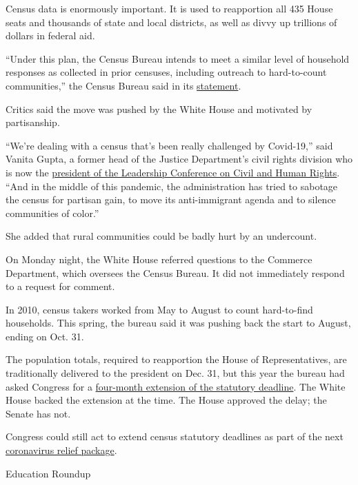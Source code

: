 Census data is enormously important. It is used to reapportion all 435
House seats and thousands of state and local districts, as well as divvy
up trillions of dollars in federal aid.

``Under this plan, the Census Bureau intends to meet a similar level of
household responses as collected in prior censuses, including outreach
to hard-to-count communities,'' the Census Bureau said in its
\href{https://www.census.gov/newsroom/press-releases/2020/delivering-complete-accurate-count.html}{statement}.

Critics said the move was pushed by the White House and motivated by
partisanship.

``We're dealing with a census that's been really challenged by
Covid-19,'' said Vanita Gupta, a former head of the Justice Department's
civil rights division who is now the
\href{https://civilrights.org/about/our-staff/vanita-gupta/}{president
of the Leadership Conference on Civil and Human Rights}. ``And in the
middle of this pandemic, the administration has tried to sabotage the
census for partisan gain, to move its anti-immigrant agenda and to
silence communities of color.''

She added that rural communities could be badly hurt by an undercount.

On Monday night, the White House referred questions to the Commerce
Department, which oversees the Census Bureau. It did not immediately
respond to a request for comment.

In 2010, census takers worked from May to August to count hard-to-find
households. This spring, the bureau said it was pushing back the start
to August, ending on Oct. 31.

The population totals, required to reapportion the House of
Representatives, are traditionally delivered to the president on Dec.
31, but this year the bureau had asked Congress for a
\href{https://www.nytimes.com/2020/04/13/us/census-coronavirus-delay.html?searchResultPosition=9}{four-month
extension of the statutory deadline}. The White House backed the
extension at the time. The House approved the delay; the Senate has not.

Congress could still act to extend census statutory deadlines as part of
the next
\href{https://www.nytimes.com/2020/08/02/us/politics/coronavirus-jobless-aid.html}{coronavirus
relief package}.

Education Roundup

\hypertarget{-3}{%
\subsection{}\label{-3}}

